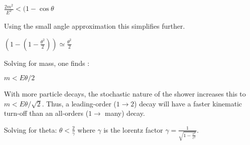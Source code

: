 $\frac{2m^2}{E^2}  < ( 1 - \cos{\theta}  $\newline

Using the small angle approximation this simplifies further.

$(1 - (1- \frac{\theta^2}{2}) )  \simeq  \frac{\theta^2}{2}  $\newline

Solving for mass, one finds :\newline

$m < E\theta/2$\newline

With more particle decays, the stochastic nature of the shower increases this to $m < E\theta/\sqrt{2}$.
Thus, a leading-order ($1\rightarrow 2$) decay will have a faster kinematic
turn-off than an all-orders ($1 \rightarrow$ many) decay.\newline

Solving for theta:\newline
 $\theta < \frac{2}{\gamma}$ where $\gamma$ is the lorentz factor $\gamma = \frac{1}{\sqrt{1-\frac{v^2}{c^2}}}  $.
